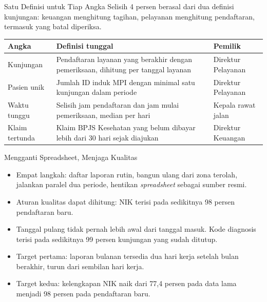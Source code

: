 \documentclass[aspectratio=169, table, 12pt]{beamer}
\begin{document}
\begin{frame}{{\Large Satu Definisi untuk Tiap Angka}}
  \small Selisih 4 persen berasal dari dua definisi kunjungan: keuangan menghitung tagihan, pelayanan
  menghitung pendaftaran, termasuk yang batal diperiksa.

  \vspace{4pt}
  \footnotesize
  \begin{tabularx}{\textwidth}{L{2.0cm}YL{2.7cm}}
    \hline
    \textbf{Angka} & \textbf{Definisi tunggal} & \textbf{Pemilik} \\
    \hline
    Kunjungan & Pendaftaran layanan yang berakhir dengan pemeriksaan, dihitung per tanggal layanan & Direktur Pelayanan \\
    \hline
    Pasien unik & Jumlah ID induk MPI dengan minimal satu kunjungan dalam periode & Direktur Pelayanan \\
    \hline
    Waktu tunggu & Selisih jam pendaftaran dan jam mulai pemeriksaan, median per hari & Kepala rawat jalan \\
    \hline
    Klaim tertunda & Klaim BPJS Kesehatan yang belum dibayar lebih dari 30 hari sejak diajukan & Direktur Keuangan \\
    \hline
  \end{tabularx}
\end{frame}

\begin{frame}{{\Large Mengganti Spreadsheet, Menjaga Kualitas}}
  \small
  \vspace{6pt}
  \begin{itemize}
    \item Empat langkah: daftar laporan rutin, bangun ulang dari zona terolah, jalankan paralel dua
          periode, hentikan \textit{spreadsheet} sebagai sumber resmi.
    \item Aturan kualitas dapat dihitung: NIK terisi pada sedikitnya 98 persen pendaftaran baru.
    \item Tanggal pulang tidak pernah lebih awal dari tanggal masuk. Kode diagnosis terisi pada
          sedikitnya 99 persen kunjungan yang sudah ditutup.
    \item Target pertama: laporan bulanan tersedia dua hari kerja setelah bulan berakhir, turun dari
          sembilan hari kerja.
    \item Target kedua: kelengkapan NIK naik dari 77,4 persen pada data lama menjadi 98 persen pada
          pendaftaran baru.
  \end{itemize}
\end{frame}
\end{document}
